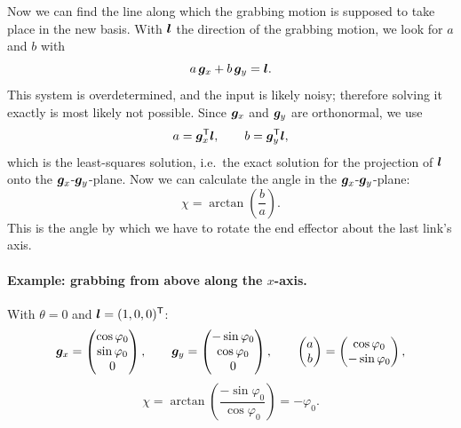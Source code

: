 Now we can find the line along which the grabbing motion is supposed to
take place in the new basis. With $\bm{l}$ the direction of the
grabbing motion, we look for $a$ and $b$ with
\[
  a \, \bm{g}_x + b \, \bm{g}_y = \bm{l} .
\]
This system is overdetermined, and the input is likely noisy; therefore
solving it exactly is most likely not possible. Since $\bm{g}_x$ and
$\bm{g}_y$ are orthonormal, we use
\[
  a = \bm{g}_x^{\mathsf{T}} \bm{l} , \qquad
  b = \bm{g}_y^{\mathsf{T}} \bm{l} ,
\]
which is the least-squares solution, i.e.\ the exact solution for the
projection of $\bm{l}$ onto the $\bm{g}_x$-$\bm{g}_y$-plane. Now we
can calculate the angle in the $\bm{g}_x$-$\bm{g}_y$-plane:
\[
  \chi = \arctan\left(\frac{b}{a}\right) .
\]
This is the angle by which we have to rotate the end effector about the
last link's axis.

\paragraph{Example: grabbing from above along the $x$-axis.}
With $\theta = 0$ and $\bm{l} = (1, 0, 0)^{\mathsf{T}}$:
\[
  \bm{g}_x = \begin{pmatrix} \cos\varphi_0 \\ \sin\varphi_0 \\ 0 \end{pmatrix} ,
  \qquad
  \bm{g}_y = \begin{pmatrix} -\sin\varphi_0 \\ \cos\varphi_0 \\ 0 \end{pmatrix} ,
  \qquad
  \begin{pmatrix} a \\ b \end{pmatrix}
  = \begin{pmatrix} \cos\varphi_0 \\ -\sin\varphi_0 \end{pmatrix} ,
\]
\[
  \chi = \arctan\left(\frac{-\sin\varphi_0}{\cos\varphi_0}\right) = -\varphi_0 .
\]